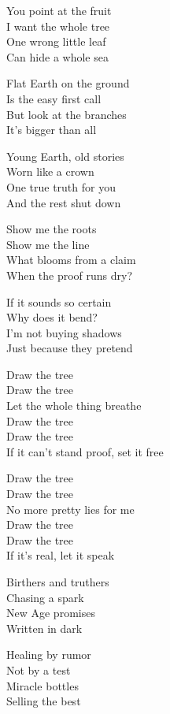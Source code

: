 \begin{lyrics}
You point at the fruit\\
I want the whole tree\\
One wrong little leaf\\
Can hide a whole sea

Flat Earth on the ground\\
Is the easy first call\\
But look at the branches\\
It’s bigger than all

Young Earth, old stories\\
Worn like a crown\\
One true truth for you\\
And the rest shut down

Show me the roots\\
Show me the line\\
What blooms from a claim\\
When the proof runs dry?

If it sounds so certain\\
Why does it bend?\\
I’m not buying shadows\\
Just because they pretend

Draw the tree\\
Draw the tree\\
Let the whole thing breathe\\
Draw the tree\\
Draw the tree\\
If it can’t stand proof, set it free

Draw the tree\\
Draw the tree\\
No more pretty lies for me\\
Draw the tree\\
Draw the tree\\
If it’s real, let it speak

Birthers and truthers\\
Chasing a spark\\
New Age promises\\
Written in dark

Healing by rumor\\
Not by a test\\
Miracle bottles\\
Selling the best


\end{lyrics}

